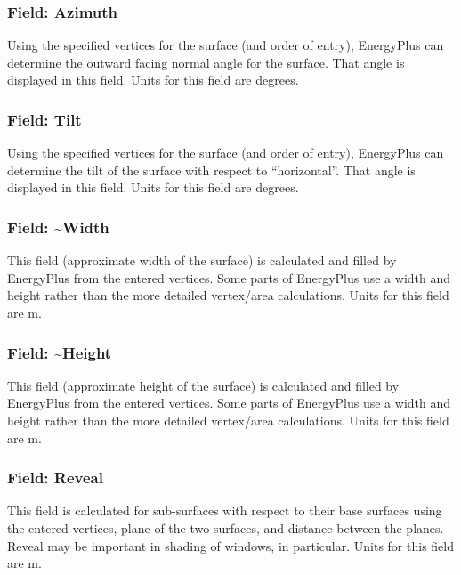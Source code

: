 \subsubsection{Field: Azimuth}\label{field-azimuth}

Using the specified vertices for the surface (and order of entry), EnergyPlus can determine the outward facing normal angle for the surface. That angle is displayed in this field. Units for this field are degrees.

\subsubsection{Field: Tilt}\label{field-tilt}

Using the specified vertices for the surface (and order of entry), EnergyPlus can determine the tilt of the surface with respect to ``horizontal''. That angle is displayed in this field. Units for this field are degrees.

\subsubsection{Field: \textasciitilde{}Width}\label{field-width}

This field (approximate width of the surface) is calculated and filled by EnergyPlus from the entered vertices. Some parts of EnergyPlus use a width and height rather than the more detailed vertex/area calculations. Units for this field are m.

\subsubsection{Field: \textasciitilde{}Height}\label{field-height}

This field (approximate height of the surface) is calculated and filled by EnergyPlus from the entered vertices. Some parts of EnergyPlus use a width and height rather than the more detailed vertex/area calculations. Units for this field are m.

\subsubsection{Field: Reveal}\label{field-reveal}

This field is calculated for sub-surfaces with respect to their base surfaces using the entered vertices, plane of the two surfaces, and distance between the planes. Reveal may be important in shading of windows, in particular. Units for this field are m.

